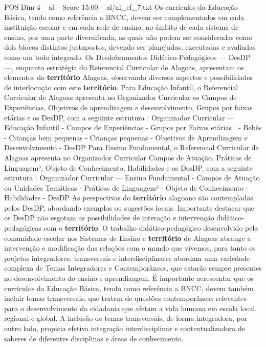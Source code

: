 \begin{textsample}{POS Dim 4 – al – Score 15.00 – al/al\_ef\_7.txt}
Os currículos da Educação Básica, tendo como referência a BNCC, devem ser complementados em cada instituição escolar e em cada rede de ensino, no âmbito de cada sistema de ensino, por uma parte diversificada, as quais não podem ser consideradas como dois blocos distintos justapostos, devendo ser planejadas, executadas e avaliadas como um todo integrado.
Os Desdobramentos Didático-Pedagógicos — DesDP —, enquanto estratégia do Referencial Curricular de Alagoas, apresentam os elementos do \textbf{território} Alagoas, observando diversos aspectos e possibilidades de interlocução com este \textbf{território}.
Para Educação Infantil, o Referencial Curricular de Alagoas apresenta no Organizador Curricular os Campos de Experiências, Objetivos de aprendizagem e desenvolvimento, Grupos por faixas etárias e os DesDP, com a seguinte estrutura : Organizador Curricular — Educação Infantil - Campos de Experiências - Grupos por Faixas etárias : - Bebês - Crianças bem pequenas - Crianças pequenas - Objetivos de Aprendizagem e Desenvolvimento - DesDP Para Ensino Fundamental, o Referencial Curricular de Alagoas apresenta no Organizador Curricular Campos de Atuação, Práticas de Linguagem³, Objeto de Conhecimento, Habilidades e os DesDP, com a seguinte estrutura : Organizador Curricular — Ensino Fundamental - Campos de Atuação ou Unidades Temáticas - Práticas de Linguagem³ - Objeto de Conhecimento - Habilidades - DesDP As perspectivas do \textbf{território} alagoano são contempladas pelos DesDP, abordando exemplos ou sugestões locais.
Importante destacar que os DesDP não esgotam as possibilidades de interação e intervenção didático-pedagógicas com o \textbf{território}.
O trabalho didático-pedagógico desenvolvido pela comunidade escolar nos Sistemas de Ensino e \textbf{território} de Alagoas abrange a intervenção e modificação das relações com o mundo que vivemos, para tanto os projetos integradores, transversais e interdisciplinares abordam uma variedade complexa de Temas Integradores e Contemporâneos, que estarão sempre presentes no desenvolvimento do ensino e aprendizagem.
É importante acrescentar que os currículos da Educação Básica, tendo como referência a BNCC, devem também incluir temas transversais, que tratem de questões contemporâneas relevantes para o desenvolvimento da cidadania que afetam a vida humana em escala local, regional e global.
A inclusão de temas transversais, de forma integradora, por outro lado, propicia efetiva integração interdisciplinar e contextualizadora de saberes de diferentes disciplinas e áreas de conhecimento.

\end{textsample}
